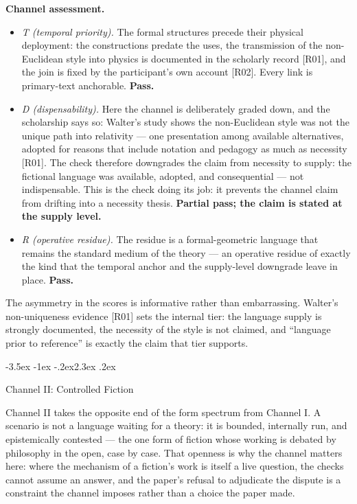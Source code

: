 \documentclass[11pt,a4paper]{article}
\makeatletter
\renewcommand\section{\@startsection{section}{1}{\z@}%
  {-3.5ex \@plus -1ex \@minus -.2ex}{2.3ex \@plus .2ex}%
  {\normalfont\Large\bfseries\raggedright}}
\makeatother
\begin{document}
\textbf{Channel assessment.}

\begin{itemize}[leftmargin=1.6em,itemsep=2pt,parsep=0pt,topsep=3pt]
\item \textit{T (temporal priority).} The formal structures precede their physical deployment: the constructions predate the uses, the transmission of the non-Euclidean style into physics is documented in the scholarly record [R01], and the join is fixed by the participant's own account [R02]. Every link is primary-text anchorable. \textbf{Pass.}
\item \textit{D (dispensability).} Here the channel is deliberately graded down, and the scholarship says so: Walter's study shows the non-Euclidean style was not the unique path into relativity — one presentation among available alternatives, adopted for reasons that include notation and pedagogy as much as necessity [R01]. The check therefore downgrades the claim from necessity to supply: the fictional language was available, adopted, and consequential — not indispensable. This is the check doing its job: it prevents the channel claim from drifting into a necessity thesis. \textbf{Partial pass; the claim is stated at the supply level.}
\item \textit{R (operative residue).} The residue is a formal-geometric language that remains the standard medium of the theory — an operative residue of exactly the kind that the temporal anchor and the supply-level downgrade leave in place. \textbf{Pass.}
\end{itemize}

The asymmetry in the scores is informative rather than embarrassing. Walter's non-uniqueness evidence [R01] sets the internal tier: the language supply is strongly documented, the necessity of the style is not claimed, and ``language prior to reference'' is exactly the claim that tier supports.

\section{Channel II: Controlled Fiction}

Channel II takes the opposite end of the form spectrum from Channel I. A scenario is not a language waiting for a theory: it is bounded, internally run, and epistemically contested --- the one form of fiction whose working is debated by philosophy in the open, case by case. That openness is why the channel matters here: where the mechanism of a fiction's work is itself a live question, the checks cannot assume an answer, and the paper's refusal to adjudicate the dispute is a constraint the channel imposes rather than a choice the paper made.
\end{document}
